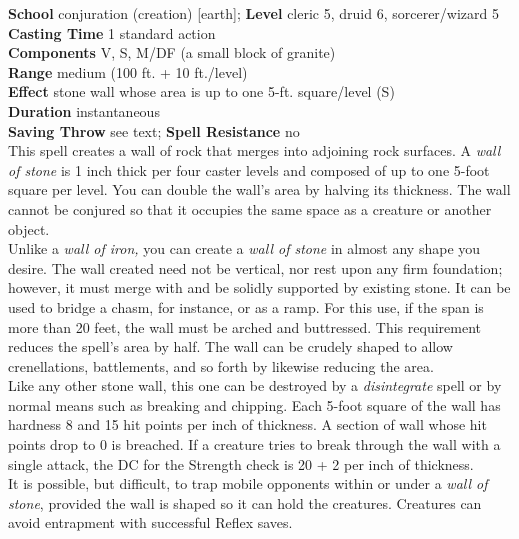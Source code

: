 \textbf{School} conjuration (creation) [earth]; \textbf{Level} cleric 5, druid 6, sorcerer/wizard 5\\
\textbf{Casting Time} 1 standard action\\
\textbf{Components} V, S, M/DF (a small block of granite)\\
\textbf{Range }medium (100 ft. + 10 ft./level)\\
\textbf{Effect} stone wall whose area is up to one 5-ft. square/level (S)\\
\textbf{Duration} instantaneous\\
\textbf{Saving Throw} see text; \textbf{Spell Resistance} no\\
This spell creates a wall of rock that merges into adjoining rock surfaces. A \textit{wall of stone }is 1 inch thick per four caster levels and composed of up to one 5-foot square per level. You can double the wall's area by halving its thickness. The wall cannot be conjured so that it occupies the same space as a creature or another object.\\
Unlike a \textit{wall of iron, }you can create a \textit{wall of stone }in almost any shape you desire. The wall created need not be vertical, nor rest upon any firm foundation; however, it must merge with and be solidly supported by existing stone. It can be used to bridge a chasm, for instance, or as a ramp. For this use, if the span is more than 20 feet, the wall must be arched and buttressed. This requirement reduces the spell's area by half. The wall can be crudely shaped to allow crenellations, battlements, and so forth by likewise reducing the area.\\
Like any other stone wall, this one can be destroyed by a \textit{disintegrate }spell or by normal means such as breaking and chipping. Each 5-foot square of the wall has hardness 8 and 15 hit points per inch of thickness. A section of wall whose hit points drop to 0 is breached. If a creature tries to break through the wall with a single attack, the DC for the Strength check is 20 + 2 per inch of thickness.\\
It is possible, but difficult, to trap mobile opponents within or under a \textit{wall of stone}, provided the wall is shaped so it can hold the creatures. Creatures can avoid entrapment with successful Reflex saves.\\
